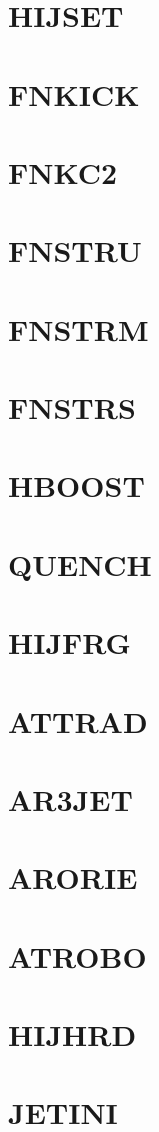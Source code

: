 \documentclass[10pt,UTF8]{ctexbook}
\begin{document}
\section{HIJSET}
\section{FNKICK}
\section{FNKC2}
\section{FNSTRU}
\section{FNSTRM}
\section{FNSTRS}
\section{HBOOST}
\section{QUENCH}
\section{HIJFRG}
\section{ATTRAD}
\section{AR3JET}
\section{ARORIE}
\section{ATROBO}
\section{HIJHRD}
\section{JETINI}
\end{document}
